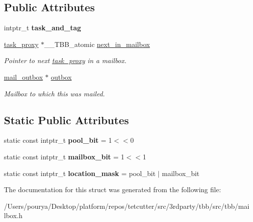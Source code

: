 \subsection*{Public Attributes}
\begin{DoxyCompactItemize}
\item 
\hypertarget{structtbb_1_1internal_1_1task__proxy_abedfdfcd6048685cf9aa032ca2380adf}{}intptr\+\_\+t {\bfseries task\+\_\+and\+\_\+tag}\label{structtbb_1_1internal_1_1task__proxy_abedfdfcd6048685cf9aa032ca2380adf}

\item 
\hypertarget{structtbb_1_1internal_1_1task__proxy_aff8d45ec3c435258ec855186b978dd00}{}\hyperlink{structtbb_1_1internal_1_1task__proxy}{task\+\_\+proxy} $\ast$\+\_\+\+\_\+\+T\+B\+B\+\_\+atomic \hyperlink{structtbb_1_1internal_1_1task__proxy_aff8d45ec3c435258ec855186b978dd00}{next\+\_\+in\+\_\+mailbox}\label{structtbb_1_1internal_1_1task__proxy_aff8d45ec3c435258ec855186b978dd00}

\begin{DoxyCompactList}\small\item\em Pointer to next \hyperlink{structtbb_1_1internal_1_1task__proxy}{task\+\_\+proxy} in a mailbox. \end{DoxyCompactList}\item 
\hypertarget{structtbb_1_1internal_1_1task__proxy_a32d3a7685efa9cf073409277295091a8}{}\hyperlink{classtbb_1_1internal_1_1mail__outbox}{mail\+\_\+outbox} $\ast$ \hyperlink{structtbb_1_1internal_1_1task__proxy_a32d3a7685efa9cf073409277295091a8}{outbox}\label{structtbb_1_1internal_1_1task__proxy_a32d3a7685efa9cf073409277295091a8}

\begin{DoxyCompactList}\small\item\em Mailbox to which this was mailed. \end{DoxyCompactList}\end{DoxyCompactItemize}
\subsection*{Static Public Attributes}
\begin{DoxyCompactItemize}
\item 
\hypertarget{structtbb_1_1internal_1_1task__proxy_a6339e879ab7b6576df404a749f603c51}{}static const intptr\+\_\+t {\bfseries pool\+\_\+bit} = 1$<$$<$0\label{structtbb_1_1internal_1_1task__proxy_a6339e879ab7b6576df404a749f603c51}

\item 
\hypertarget{structtbb_1_1internal_1_1task__proxy_a7b7339255177d3817844a39271e20484}{}static const intptr\+\_\+t {\bfseries mailbox\+\_\+bit} = 1$<$$<$1\label{structtbb_1_1internal_1_1task__proxy_a7b7339255177d3817844a39271e20484}

\item 
\hypertarget{structtbb_1_1internal_1_1task__proxy_af6bc227aa29feead34c16e8012d634e0}{}static const intptr\+\_\+t {\bfseries location\+\_\+mask} = pool\+\_\+bit $\vert$ mailbox\+\_\+bit\label{structtbb_1_1internal_1_1task__proxy_af6bc227aa29feead34c16e8012d634e0}

\end{DoxyCompactItemize}


The documentation for this struct was generated from the following file\+:\begin{DoxyCompactItemize}
\item 
/\+Users/pourya/\+Desktop/platform/repos/tetcutter/src/3rdparty/tbb/src/tbb/mailbox.\+h\end{DoxyCompactItemize}
